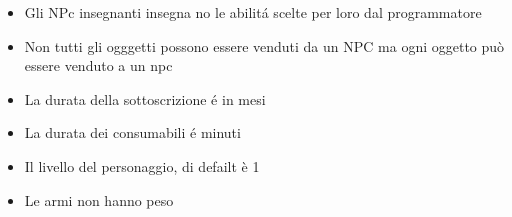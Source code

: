 
\begin{itemize}
\item Gli NPc insegnanti insegna no le abilit\'{a} scelte per loro dal programmatore
\item Non tutti gli ogggetti possono essere venduti da un NPC ma ogni oggetto pu\`{o} essere venduto a un npc
\item La durata della sottoscrizione \'{e} in mesi
\item La durata dei consumabili \'{e} minuti
\item Il livello del personaggio, di defailt \`{e} 1
\item Le armi non hanno peso


\end{itemize}